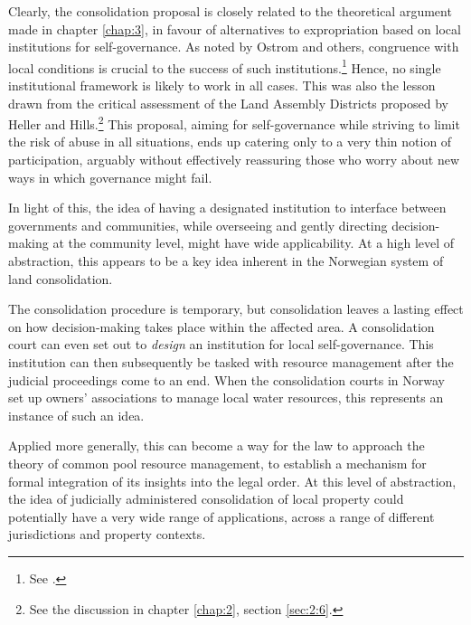 
Clearly, the consolidation proposal is closely related to the theoretical argument made in chapter \ref{chap:3}, in favour of alternatives to expropriation based on local institutions for self-governance. As noted by Ostrom and others, congruence with local conditions is crucial to the success of such institutions.\footnote{See \cite[92]{ostrom90}.} Hence, no single institutional framework is likely to work in all cases. This was also the lesson drawn from the critical assessment of the Land Assembly Districts proposed by Heller and Hills.\footnote{See the discussion in chapter \ref{chap:2}, section \ref{sec:2:6}.} This proposal, aiming for self-governance while striving to limit the risk of abuse in all situations, ends up catering only to a very thin notion of participation, arguably without effectively reassuring those who worry about new ways in which governance might fail.

In light of this, the idea of having a designated institution to interface between governments and communities, while overseeing and gently directing decision-making at the community level, might have wide applicability. At a high level of abstraction, this appears to be a key idea inherent in the Norwegian system of land consolidation.

The consolidation procedure is temporary, but consolidation leaves a lasting effect on how decision-making takes place within the affected area. A consolidation court can even set out to {\it design} an institution for local self-governance. This institution can then subsequently be tasked with resource management after the judicial proceedings come to an end. When the consolidation courts in Norway set up owners' associations to manage local water resources, this represents an instance of such an idea.

Applied more generally, this can become a way for the law to approach the theory of common pool resource management, to establish a mechanism for formal integration of its insights into the legal order. At this level of abstraction, the idea of judicially administered consolidation of local property could potentially have a very wide range of applications, across a range of different jurisdictions and property contexts.

